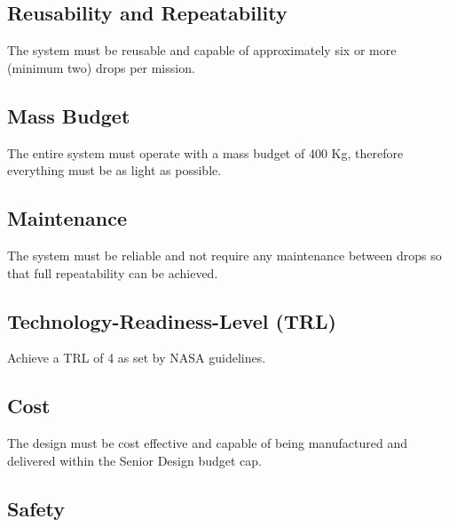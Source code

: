 \subsection{Reusability and Repeatability}

\indent\indent The system must be reusable and capable of approximately six or more (minimum two) drops per mission.


\subsection{Mass Budget}

\indent\indent The entire system must operate with a mass budget of 400 Kg, therefore everything must be as light as possible.


\subsection{Maintenance}

\indent\indent The system must be reliable and not require any maintenance between drops so that full repeatability can be achieved. 


\subsection{Technology-Readiness-Level (TRL)}

\indent\indent Achieve a TRL of 4 as set by NASA guidelines.


\subsection{Cost}

\indent\indent The design must be cost effective and capable of being manufactured and delivered within the Senior Design budget cap. 


\subsection{Safety}

